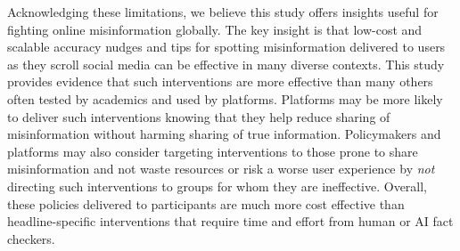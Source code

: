 \documentclass[letterpaper, 12pt, parskip=full,DIV=10]{scrartcl}
\begin{document}
Acknowledging these limitations, we believe this study offers insights useful for fighting online misinformation globally. The key insight is that low-cost and scalable accuracy nudges and tips for spotting misinformation delivered to users as they scroll social media can be effective in many diverse contexts. This study provides evidence that such interventions are more effective than many others often tested by academics and used by platforms. Platforms may be more likely to deliver such interventions knowing that they help reduce sharing of misinformation without harming sharing of true information. Policymakers and platforms may also consider targeting interventions to those prone to share misinformation and not waste resources or risk a worse user experience by \textit{not} directing such interventions to groups for whom they are ineffective. Overall, these policies delivered to participants are much more cost effective than headline-specific interventions that require time and effort from human or AI fact checkers.

%
\end{document}
